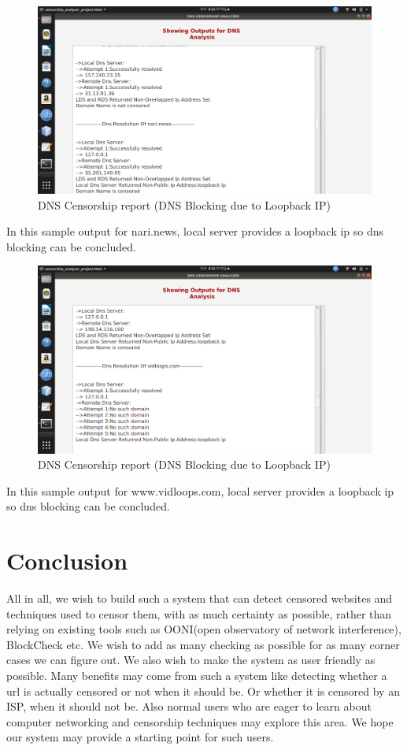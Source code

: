 \documentclass[12pt]{article}
\begin{document}
\newpage
\begin{figure}[H]
    \centering
    \includegraphics[width=\textwidth]{nariNews.png}
    \caption{DNS Censorship report (DNS Blocking due to Loopback IP)}
    \label{fig:dcr2}
\end{figure}
In this sample output for nari.news, local server provides a loopback ip so dns blocking can be concluded.

\newpage
\begin{figure}[H]
    \centering
    \includegraphics[width=\textwidth]{vidloops.png}
    \caption{DNS Censorship report (DNS Blocking due to Loopback IP)}
    \label{fig:dcr2}
\end{figure}
In this sample output for www.vidloops.com, local server provides a loopback ip so dns blocking can be concluded.


\newpage
\section{Conclusion}
All in all, we wish to build such a system that can detect censored websites and techniques used to censor them, with as much certainty as possible, rather than relying on existing tools such as OONI(open observatory of network interference), BlockCheck etc. We wish to add as many checking as possible for as many corner cases we can figure out. We also wish to make the system as user friendly as possible. Many benefits may come from such a system like detecting whether a url is actually censored or not when it should be. Or whether it is censored by an ISP, when it should not be. Also normal users who are eager to learn about computer networking and censorship techniques may explore this area. We hope our system may provide a starting point for such users.
\end{document}
